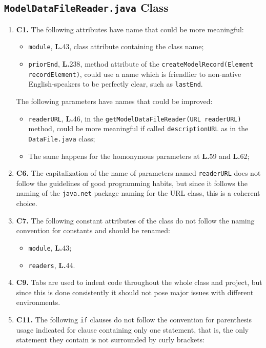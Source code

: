 \subsection{\texttt{ModelDataFileReader.java} Class}
\begin{enumerate}
\item \textbf{C1.} The following attributes have name that could be more meaningful:
	\begin{itemize}
	\item \texttt{module}, \textbf{L.}43, class attribute containing the class name;
	\item \texttt{priorEnd}, \textbf{L.}238, method attribute of the \texttt{createModelRecord(Element recordElement)}, could use a name which is friendlier to non-native English-speakers to be perfectly clear, such as \texttt{lastEnd}.
	\end{itemize}	
The following parameters have names that could be improved:
	\begin{itemize}
	\item \texttt{readerURL}, \textbf{L.}46, in the \texttt{getModelDataFileReader(URL readerURL)} method, could be more meaningful if called \texttt{descriptionURL} as in the \texttt{DataFile.java} class;
	\item The same happens for the homonymous parameters at \textbf{L.}59 and \textbf{L.}62;
	\end{itemize}
\item \textbf{C6.} The capitalization of the name of parameters named \texttt{readerURL} does not follow the guidelines of good programming habits, but since it follows the naming of the \texttt{java.net} package naming for the URL class, this is a coherent choice.
\item \textbf{C7.} The following constant attributes of the class do not follow the naming convention for constants and should be renamed:
	\begin{itemize}
	\item \texttt{module}, \textbf{L.}43;
	\item \texttt{readers}, \textbf{L.}44.
	\end{itemize}
\item \textbf{C9.} Tabs are used to indent code throughout the whole class and project, but since this is done consistently it should not pose major issues with different environments.
\item \textbf{C11.} The following \texttt{if} clauses do not follow the convention for parenthesis usage indicated for clause containing only one statement, that is, the only statement they contain is not surrounded by curly brackets:

\end{enumerate}
